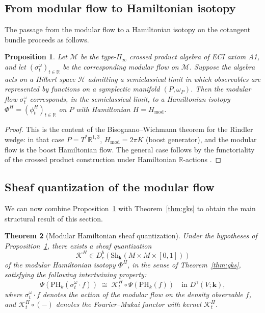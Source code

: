 \documentclass[12pt,a4paper]{amsart}
\newtheorem{theorem}{Theorem}[section]
\newtheorem{proposition}[theorem]{Proposition}
\theoremstyle{definition}
\newcommand{\R}{\mathbb{R}}
\newcommand{\kk}{\mathbf{k}}                %
\newcommand{\Sh}{\mathrm{Sh}}               %
\newcommand{\Dbc}{D^b_c}                     %
\newcommand{\PHk}{\mathrm{PH}_k}            %
\newcommand{\Dgamma}{D^\gamma}              %
\begin{document}
\subsection{From modular flow to Hamiltonian isotopy}

The passage from the modular flow to a Hamiltonian isotopy on the
cotangent bundle proceeds as follows.

\begin{proposition}
  \label{prop:modular-hamiltonian-isotopy}
  Let $\mathcal{M}$ be the type-II$_\infty$ crossed product algebra of
  ECI axiom A1, and let $(\sigma_t^\omega)_{t\in\R}$ be the
  corresponding modular flow on $\mathcal{M}$.  Suppose the algebra acts
  on a Hilbert space $\mathcal{H}$ admitting a semiclassical limit in
  which observables are represented by functions on a symplectic
  manifold $(P, \omega_P)$.  Then the modular flow $\sigma_t^\omega$
  corresponds, in the semiclassical limit, to a Hamiltonian isotopy
  $\Phi^H = (\phi_t^H)_{t\in\R}$ on $P$ with Hamiltonian
  $H = H_\mathrm{mod}$.
\end{proposition}

\begin{proof}
  This is the content of the Bisognano--Wichmann theorem
  \cite{BisognanoWichmann1976} for the Rindler wedge: in that case
  $P = T^*\R^{1,3}$, $H_\mathrm{mod} = 2\pi K$ (boost generator), and
  the modular flow is the boost Hamiltonian flow.  The general case
  follows by the functoriality of the crossed product construction under
  Hamiltonian $\R$-actions \cite{CLPW2023,DEHK2025}.
\end{proof}

\subsection{Sheaf quantization of the modular flow}

We can now combine Proposition~\ref{prop:modular-hamiltonian-isotopy}
with Theorem~\ref{thm:gks} to obtain the main structural result of this
section.

\begin{theorem}[Modular Hamiltonian sheaf quantization]
  \label{thm:modular-sheaf-quantization}
  Under the hypotheses of Proposition~\ref{prop:modular-hamiltonian-isotopy},
  there exists a sheaf quantization
  \[
    \mathcal{K}^H \in \Dbc(\Sh_\kk(M \times M \times [0,1]))
  \]
  of the modular Hamiltonian isotopy $\Phi^H$, in the sense of
  Theorem~\ref{thm:gks}, satisfying the following intertwining property:
  \begin{equation}
    \label{eq:intertwining}
    \Psi(\PHk(\sigma_t^\omega \cdot f))
    \;\cong\;
    \mathcal{K}^H_t \circ \Psi(\PHk(f))
    \quad \text{in } \Dgamma(V;\kk),
  \end{equation}
  where $\sigma_t^\omega \cdot f$ denotes the action of the modular flow
  on the density observable $f$, and $\mathcal{K}^H_t \circ (-)$
  denotes the Fourier--Mukai functor with kernel $\mathcal{K}^H_t$.
\end{theorem}
\end{document}
